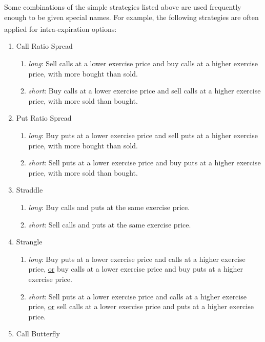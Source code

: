 \documentclass[12pt, a4paper, notitlepage]{article}
\numberwithin{equation}{subsection}
\numberwithin{figure}{subsection}
\numberwithin{table}{subsection}
\begin{document}
Some combinations of the simple strategies listed above are used frequently enough to be given special names.  For example, the following strategies are often applied for intra-expiration options\textsuperscript{\cite{Natenberg}}:  

\begin{enumerate}
	\item Call Ratio Spread
    	\begin{enumerate}
    		\item \textit{long}:  Sell calls at a lower exercise price and buy calls at a higher exercise price, with more bought than sold.
            \item \textit{short}:  Buy calls at a lower exercise price and sell calls at a higher exercise price, with more sold than bought.
    	\end{enumerate}
	\item Put Ratio Spread
    	\begin{enumerate}
    		\item \textit{long}:  Buy puts at a lower exercise price and sell puts at a higher exercise price, with more bought than sold.
            \item \textit{short}:  Sell puts at a lower exercise price and buy puts at a higher exercise price, with more sold than bought.
    	\end{enumerate}
	\item Straddle
    	\begin{enumerate}
    		\item \textit{long}:  Buy calls and puts at the same exercise price.
            \item \textit{short}:  Sell calls and puts at the same exercise price.
    	\end{enumerate}
    \item Strangle
    	\begin{enumerate}
    		\item \textit{long}: Buy puts at a lower exercise price and calls at a higher exercise price, \underline{or} buy calls at a lower exercise price and buy puts at a higher exercise price.
            \item \textit{short}:  Sell puts at a lower exercise price and calls at a higher exercise price, \underline{or} sell calls at a lower exercise price and puts at a higher exercise price.
    	\end{enumerate}
    \item Call Butterfly
    	\begin{enumerate}

\end{enumerate}
\end{enumerate}
\end{document}
